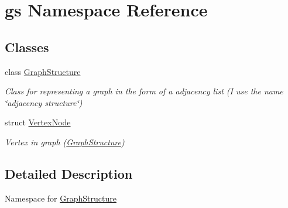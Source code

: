 \hypertarget{namespacegs}{}\section{gs Namespace Reference}
\label{namespacegs}
\subsection*{Classes}
\begin{DoxyCompactItemize}
\item 
class \mbox{\hyperlink{classgs_1_1_graph_structure}{Graph\+Structure}}
\begin{DoxyCompactList}\small\item\em Class for representing a graph in the form of a adjacency list (I use the name \char`\"{}adjacency structure\char`\"{}) \end{DoxyCompactList}\item 
struct \mbox{\hyperlink{structgs_1_1_vertex_node}{Vertex\+Node}}
\begin{DoxyCompactList}\small\item\em Vertex in graph (\mbox{\hyperlink{classgs_1_1_graph_structure}{Graph\+Structure}}) \end{DoxyCompactList}\end{DoxyCompactItemize}


\subsection{Detailed Description}
Namespace for \mbox{\hyperlink{classgs_1_1_graph_structure}{Graph\+Structure}} 